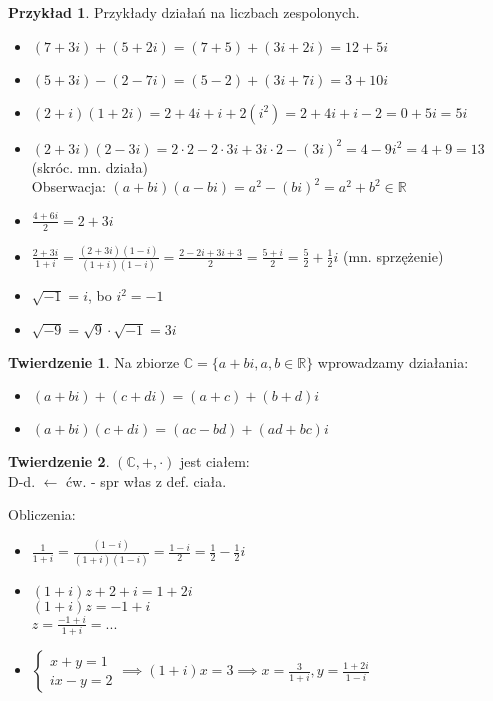 \documentclass{article}
\theoremstyle{definition}
\theoremstyle{definition}
\newtheorem{tw}{Twierdzenie}[subsection]
\theoremstyle{definition}
\newtheorem{pk}{Przykład}[subsection]
\theoremstyle{definition}
\begin{document}
\begin{pk}
    Przykłady działań na liczbach zespolonych.
    \begin{itemize}
        \item $(7+3i) + (5+2i) = (7+5) + (3i + 2i) = 12 + 5i$
        \item $(5+3i) - (2-7i) = (5-2) + (3i + 7i) = 3 + 10i$
        \item $(2+i)(1+2i)=2+4i+i+2(i^2)=2+4i+i-2=0+5i=5i$
        \item $(2+3i)(2-3i)=2\cdot 2 - 2\cdot 3i + 3i \cdot 2 - (3i)^2 = 4 - 9i^2 = 4 + 9 = 13$ (skróc. mn. działa)\\
        Obserwacja: $(a+bi)(a-bi)=a^2-(bi)^2=a^2+b^2 \in \mathbb{R}$ 
        \item $\frac{4+6i}{2}=2+3i$
        \item $\frac{2+3i}{1+i}=\frac{(2+3i)(1-i)}{(1+i)(1-i)} = \frac{2-2i+3i+3}{2}= \frac{5+i}{2} = \frac{5}{2} + \frac{1}{2} i$  (mn. sprzężenie)
        \item $\sqrt{-1}=i$, bo $i^2 = -1$
        \item $\sqrt{-9}=\sqrt{9}\cdot\sqrt{-1}=3i$
    \end{itemize}
\end{pk}

\begin{tw}
    Na zbiorze $\mathbb{C}=\{a+bi, a,b\in\mathbb{R}\}$ wprowadzamy działania:
    \begin{itemize}
        \item $(a+bi)+(c+di)=(a+c)+(b+d)i$
        \item $(a+bi)(c+di)=(ac-bd)+(ad+bc)i$
    \end{itemize}
\end{tw}

\begin{tw}
    $(\mathbb{C},+,\cdot)$ jest ciałem:\\
    D-d. $\leftarrow$ ćw. - spr włas z def. ciała.
\end{tw}

Obliczenia:
\begin{itemize}
    \item $\frac{1}{1+i}=\frac{(1-i)}{(1+i)(1-i)}=\frac{1-i}{2}=\frac{1}{2} - \frac{1}{2} i$
    \item $(1+i)z +2+i=1+2i$\\
    $(1+i)z=-1+i$\\
    $z=\frac{-1+i}{1+i}=...$\\
    \item $\begin{cases}
        x+y=1\\
        ix-y=2
    \end{cases}\implies (1+i)x=3 \implies x = \frac{3}{1+i}, y=\frac{1+2i}{1-i}$
\end{itemize}
\end{document}
